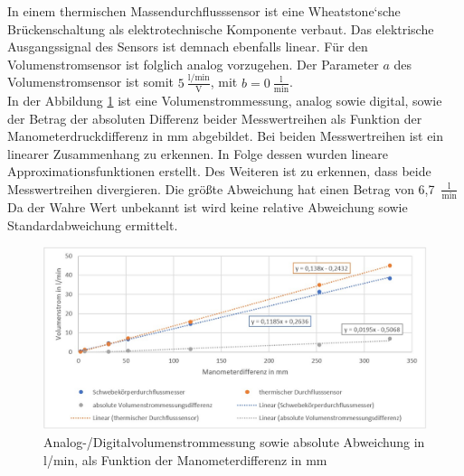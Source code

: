 In einem thermischen Massendurchflusssensor ist eine Wheatstone`sche Brückenschaltung als elektrotechnische Komponente verbaut. Das elektrische Ausgangssignal des Sensors ist demnach ebenfalls linear. Für den Volumenstromsensor ist folglich analog vorzugehen. Der Parameter $a$ des Volumenstromsensor ist somit $5~\frac{\mathrm{l}/\mathrm{min}}{\mathrm{V}}$, mit $b=0~\frac{\mathrm{l}}{\mathrm{min}}$.\\

In der Abbildung \ref{fig:volumenstrom_messung} ist eine Volumenstrommessung, analog sowie digital, sowie der Betrag der absoluten Differenz beider Messwertreihen als Funktion der Manometerdruckdifferenz in mm abgebildet. Bei beiden Messwertreihen ist ein linearer Zusammenhang zu erkennen. In Folge dessen wurden lineare Approximationsfunktionen erstellt. Des Weiteren ist zu erkennen, dass beide Messwertreihen divergieren. Die größte Abweichung hat einen Betrag von 6,7~$\frac{\mathrm{l}}{\mathrm{min}}$ Da der \glqq Wahre\grqq{} Wert unbekannt ist wird keine relative Abweichung sowie Standardabweichung ermittelt.\\ 



\begin{figure}[h!] %
\centering
\includegraphics[width=1\textwidth]{Bilder/Volumenstrommessungsverleich.jpg}
\vspace{0em}
 \caption[Analog-/Digitalvolumenstrommessung sowie absolute Abweichung in l/min, als Funktion der Manometerdifferenz in mm]
{Analog-/Digitalvolumenstrommessung sowie absolute Abweichung in l/min, als Funktion der Manometerdifferenz in mm}\label{fig:volumenstrom_messung}
\end{figure}

